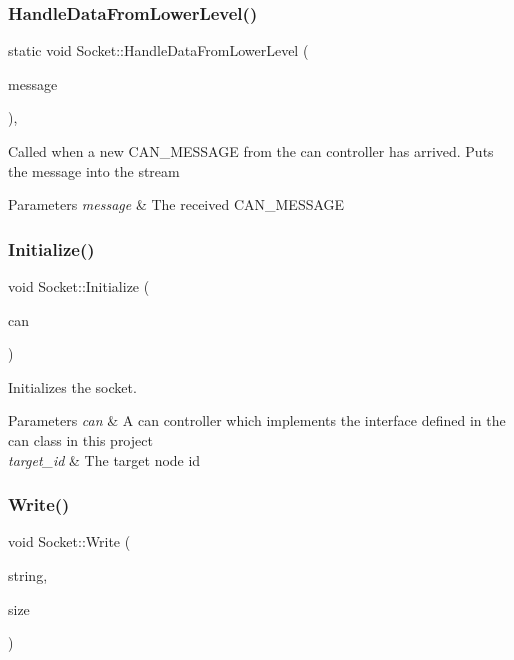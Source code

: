 \subsubsection{\texorpdfstring{Handle\+Data\+From\+Lower\+Level()}{HandleDataFromLowerLevel()}}
{\footnotesize\ttfamily static void Socket\+::\+Handle\+Data\+From\+Lower\+Level (\begin{DoxyParamCaption}\item[{\hyperlink{struct_can_message}{Can\+Message} \&}]{message }\end{DoxyParamCaption})\hspace{0.3cm}{\ttfamily [inline]}, {\ttfamily [static]}}

Called when a new C\+A\+N\+\_\+\+M\+E\+S\+S\+A\+GE from the can controller has arrived. Puts the message into the stream 
\begin{DoxyParams}{Parameters}
{\em message} & The received C\+A\+N\+\_\+\+M\+E\+S\+S\+A\+GE \\
\hline
\end{DoxyParams}
\hypertarget{class_socket_a2039f4408295019f309d7cdffa36c744}{}\label{class_socket_a2039f4408295019f309d7cdffa36c744} 
\subsubsection{\texorpdfstring{Initialize()}{Initialize()}}
{\footnotesize\ttfamily void Socket\+::\+Initialize (\begin{DoxyParamCaption}\item[{\hyperlink{class_c_a_n}{C\+AN} $\ast$}]{can }\end{DoxyParamCaption})\hspace{0.3cm}{\ttfamily [inline]}}

Initializes the socket. 
\begin{DoxyParams}{Parameters}
{\em can} & A can controller which implements the interface defined in the can class in this project \\
\hline
{\em target\+\_\+id} & The target node id \\
\hline
\end{DoxyParams}
\hypertarget{class_socket_a356ea1b27dbcb15324a4c8aaf85e5ed9}{}\label{class_socket_a356ea1b27dbcb15324a4c8aaf85e5ed9} 
\subsubsection{\texorpdfstring{Write()}{Write()}}
{\footnotesize\ttfamily void Socket\+::\+Write (\begin{DoxyParamCaption}\item[{uint8\+\_\+t $\ast$}]{string,  }\item[{uint16\+\_\+t}]{size }\end{DoxyParamCaption})\hspace{0.3cm}{\ttfamily [virtual]}}

